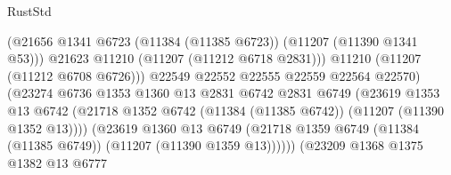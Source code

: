 \begin{lexlean}{RustStd}
\begin{coremodule}
                                              (@21656
                                                @1341
                                                @6723
                                                (@11384 (@11385 @6723))
                                                (@11207 (@11390 @1341 @53)))
                                              @21623
                                              @11210
                                              (@11207 (@11212 @6718 @2831)))
                                            @11210
                                            (@11207 (@11212 @6708 @6726)))
                                          @22549
                                          @22552
                                          @22555
                                          @22559
                                          @22564
                                          @22570)
                                        (@23274
                                          @6736
                                          @1353
                                          @1360
                                          @13
                                          @2831
                                          @6742
                                          @2831
                                          @6749
                                          (@23619
                                            @1353
                                            @13
                                            @6742
                                            (@21718
                                              @1352
                                              @6742
                                              (@11384 (@11385 @6742))
                                              (@11207 (@11390 @1352 @13))))
                                          (@23619
                                            @1360
                                            @13
                                            @6749
                                            (@21718
                                              @1359
                                              @6749
                                              (@11384 (@11385 @6749))
                                              (@11207 (@11390 @1359 @13))))))
                                      (@23209
                                        @1368
                                        @1375
                                        @1382
                                        @13
                                        @6777

\end{coremodule}
\end{lexlean}
